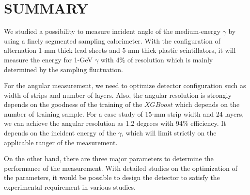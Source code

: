 \documentclass[jkps,preprint,fleqn,showpacs,showkeys]{revtex4}
\newcommand{\XGB}{XGBoost}
\begin{document}

\section{SUMMARY}
We studied a possibility to measure incident angle of the medium-energy $\gamma$ by using a finely segmented sampling calorimeter. With the configuration of alternation 1-mm thick lead sheets and 5-mm thick plastic scintillators, it will measure the energy for 1-GeV $\gamma$ with 4$\%$ of resolution which is mainly determined by the sampling fluctuation. 

For the angular measurement, we need to optimize detector configuration such as width of strips and number of layers. Also, the angular resolution is strongly depends on the goodness of the training of the $\XGB$ which depends on the number of training sample. For a case study of 15-mm strip width and 24 layers, we can achieve the angular resolution as 1.2 degrees with 94$\%$ efficiency. It depends on the incident energy of the $\gamma$, which will limit strictly on the applicable ranger of the measurement. 

On the other hand, there are three major parameters to determine the performance of the measurement. With detailed studies on the optimization of the parameters, it would be possible to design the detector to satisfy the experimental requirement in various studies. 




\label{sec:con}



\begin{acknowledgments}
\end{acknowledgments}


\end{document}
